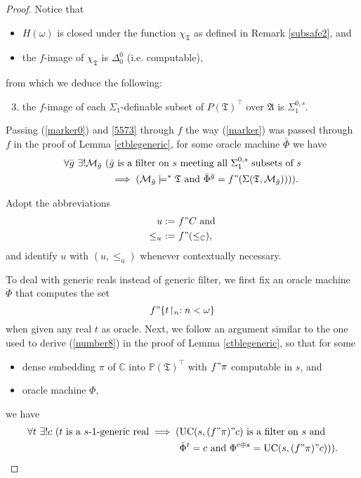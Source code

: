 \documentclass[12pt]{article}
\numberwithin{equation}{section}
\begin{document}
\begin{proof}
Notice that
\begin{itemize}
    \item $H(\omega)$ is closed under the function $\chi_{\mathfrak{T}}$ as defined in Remark \ref{subsafe2}, and 
    \item the $f$-image of $\chi_{\mathfrak{T}}$ is $\Delta^0_0$ (i.e. computable),
\end{itemize} 
from which we deduce the following:
\begin{enumerate}[label=(\arabic*)]
    \setcounter{enumi}{2}
    \item\label{5573} the $f$-image of each $\Sigma_1$-definable subset of $P(\mathfrak{T})^{\top}$ over $\mathfrak{A}$ is $\Sigma^{0, s}_1$.
\end{enumerate}

Passing (\ref{marker0}) and \ref{5573} through $f$ the way (\ref{marker}) was passed through $f$ in the proof of Lemma \ref{ctblegeneric}, for some oracle machine $\bar{\Phi}$ we have
\begin{align}\label{number9}
\begin{split}
    \forall \bar{g} \ \exists ! \mathcal{M}_{\bar{g}} \ ( & \bar{g} \text{ is a filter on } s \text{ meeting all } \Sigma^{0, s}_1 \text{ subsets of } s \\
    & \implies (\mathcal{M}_{\bar{g}} \models^* \mathfrak{T} \text{ and } \bar{\Phi}^{\bar{g}} = f" (\Sigma(\mathfrak{T}, \mathcal{M}_{\bar{g}})))) \text{.}
\end{split}
\end{align}

Adopt the abbreviations
\begin{align*}
    u := \ & f" C \text{ and} \\
    \leq_u \ := \ & f" (\leq_{\mathbb{C}}) \text{,}
\end{align*}
and identify $u$ with $(u, \leq_u)$ whenever contextually necessary. 

To deal with generic reals instead of generic filter, we first fix an oracle machine $\ddot{\Phi}$ that computes the set $$f" \{t \! \restriction_n : n < \omega\}$$ when given any real $t$ as oracle. Next, we follow an argument similar to the one used to derive (\ref{number8}) in the proof of Lemma \ref{ctblegeneric}, so that for some 
\begin{itemize}
    \item dense embedding $\pi$ of $\mathbb{C}$ into $\mathbb{P}(\mathfrak{T})^{\top}$ with $f" \pi$ computable in $s$, and 
    \item oracle machine $\Phi$, 
\end{itemize}
we have
\begin{align}\label{number10}
\begin{split}
    \forall t \ \exists ! c \ (t \text{ is a } s \text{-} 1 \text{-generic real} \implies ( & \mathrm{UC}(s, (f" \pi)" c) \text{ is a filter on } s \text{ and} \\
    & \ddot{\Phi}^t = c \text{ and } \Phi^{c \oplus s} = \mathrm{UC}(s, (f" \pi)" c))) \text{.}
\end{split}
\end{align}


\end{proof}
\end{document}
